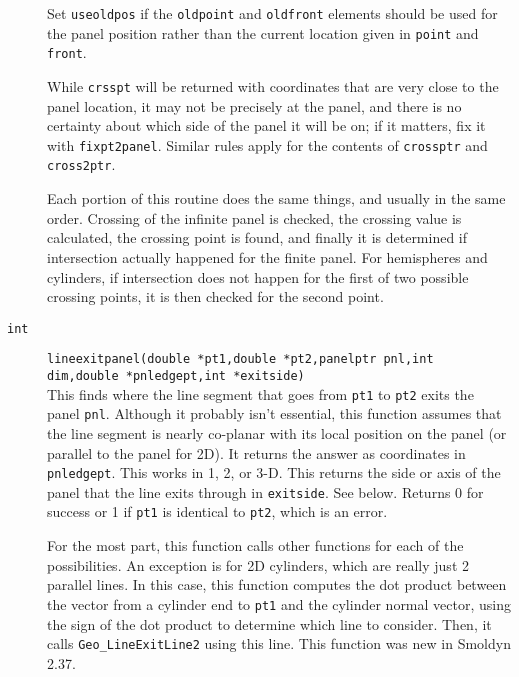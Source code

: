 \documentclass {book}
\begin{document}
\begin{description}
Set \texttt{useoldpos} if the \texttt{oldpoint} and \texttt{oldfront} elements should be used for the panel position rather than the current location given in \texttt{point} and \texttt{front}.

While \texttt{crsspt} will be returned with coordinates that are very close to the panel location, it may not be precisely at the panel, and there is no certainty about which side of the panel it will be on; if it matters, fix it with \texttt{fixpt2panel}.  Similar rules apply for the contents of \texttt{crossptr} and \texttt{cross2ptr}.

Each portion of this routine does the same things, and usually in the same order.  Crossing of the infinite panel is checked, the crossing value is calculated, the crossing point is found, and finally it is determined if intersection actually happened for the finite panel.  For hemispheres and cylinders, if intersection does not happen for the first of two possible crossing points, it is then checked for the second point.

\item[\texttt{int}]
\texttt{lineexitpanel(double *pt1,double *pt2,panelptr pnl,int dim,double *pnledgept,int *exitside)}
\hfill \\
This finds where the line segment that goes from \texttt{pt1} to \texttt{pt2} exits the panel \texttt{pnl}.  Although it probably isn't essential, this function assumes that the line segment is nearly co-planar with its local position on the panel (or parallel to the panel for 2D).  It returns the answer as coordinates in \texttt{pnledgept}.  This works in 1, 2, or 3-D.  This returns the side or axis of the panel that the line exits through in \texttt{exitside}.  See below.  Returns 0 for success or 1 if \texttt{pt1} is identical to \texttt{pt2}, which is an error.

For the most part, this function calls other functions for each of the possibilities.  An exception is for 2D cylinders, which are really just 2 parallel lines.  In this case, this function computes the dot product between the vector from a cylinder end to \texttt{pt1} and the cylinder normal vector, using the sign of the dot product to determine which line to consider.  Then, it calls \texttt{Geo\_LineExitLine2} using this line.  This function was new in Smoldyn 2.37.


\end{description}
\end{document}
